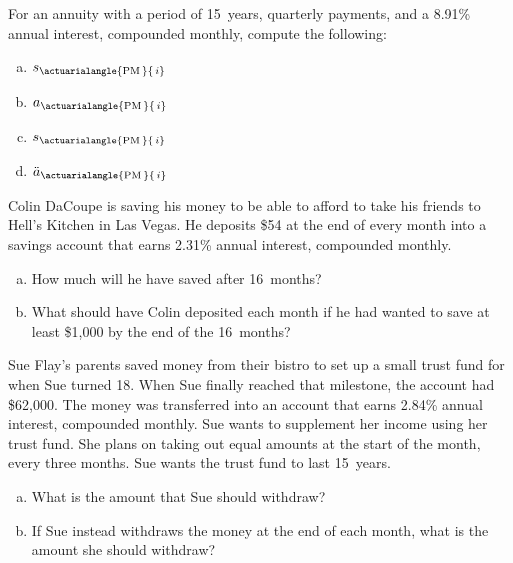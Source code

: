 \documentclass[11pt,letterpaper]{article}
\newcommand{\actS}[2]{s_{\actuarialangle{#1\,}{\,#2}}} %
\newcommand{\actA}[2]{a_{\actuarialangle{#1\,}{\,#2}}} %
\newcommand{\actAD}[2]{\ddot{a}_{\actuarialangle{#1\,}{\,#2}}} %
\begin{document}

 For an annuity with a period of 15~years, quarterly payments, and a 8.91\% annual interest, compounded monthly, compute the following:
	\begin{enumerate}[(a)]
	\item $\actS{\text{PM}}{i}$
	\item $\actA{\text{PM}}{i}$
	\item $\actS{\text{PM}}{i}$
	\item $\actAD{\text{PM}}{i}$
	\end{enumerate}



\newpage



 Colin DaCoupe is saving his money to be able to afford to take his friends to Hell's Kitchen in Las Vegas. He deposits \$54 at the end of every month into a savings account that earns 2.31\% annual interest, compounded monthly. 
	\begin{enumerate}[(a)]
	\item How much will he have saved after 16~months?
	\item What should have Colin deposited each month if he had wanted to save at least \$1,000 by the end of the 16~months?
	\end{enumerate}



\newpage



 Sue Flay's parents saved money from their bistro to set up a small trust fund for when Sue turned 18. When Sue finally reached that milestone, the account had \$62,000. The money was transferred into an account that earns 2.84\% annual interest, compounded monthly. Sue wants to supplement her income using her trust fund. She plans on taking out equal amounts at the start of the month, every three months. Sue wants the trust fund to last 15~years. 
	\begin{enumerate}[(a)]
	\item  What is the amount that Sue should withdraw?
	\item If Sue instead withdraws the money at the end of each month, what is the amount she should withdraw? 
	\end{enumerate}
\end{document}
